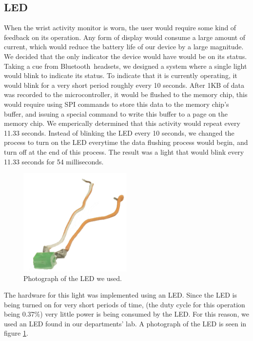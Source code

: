 \subsection{LED}
\label{Sec:LED}
When the wrist activity monitor is worn,
the user would require some kind of feedback on its operation.
Any form of display would consume a large amount of current,
which would reduce the battery life of our device by a large magnitude.
We decided that the only indicator the device would have would be on its status.
Taking a cue from Bluetooth\texttrademark ~headsets,
we designed a system where a single light would blink to indicate its status.
To indicate that it is currently operating, it would blink for a very short period roughly every 10 seconds.
After 1KB of data was recorded to the microcontroller, it would be flushed to the memory chip,
this would require using SPI commands to store this data to the memory chip's buffer,
and issuing a special command to write this buffer to a page on the memory chip.
We emperically determined that this activity would repeat every 11.33 seconds.
Instead of blinking the LED every 10 seconds, we changed the process to turn on the LED everytime the data flushing process would begin,
and turn off at the end of this process.
The result was a light that would blink every 11.33 seconds for 54 milliseconds.
\begin{figure}
\begin{center}
\includegraphics[width=0.5\textwidth]{images/LEDPhoto.jpg}
\caption{Photograph of the LED we used.}
\label{Fig:LEDPHOTO}
\end{center}
\end{figure}
The hardware for this light was implemented using an LED.
Since the LED is being turned on for very short periods of time, 
(the duty cycle for this operation being 0.37\%) very little power is being consumed by the LED.
For this reason, we used an LED found in our departments' lab. A photograph of the LED is seen in figure \ref{Fig:LEDPHOTO}.

